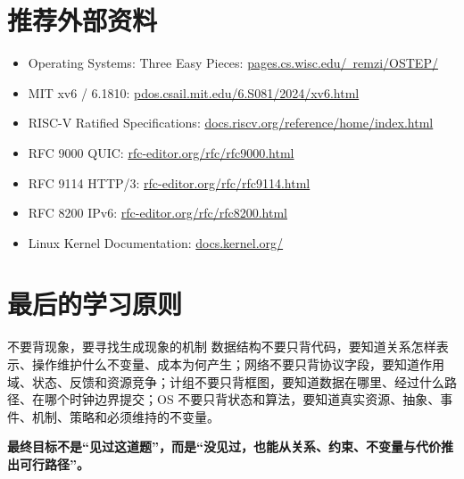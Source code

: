 \documentclass[11pt,a4paper,openany]{ctexbook}
\begin{document}
\section{推荐外部资料}
\begin{itemize}
  \item Operating Systems: Three Easy Pieces: \href{https://pages.cs.wisc.edu/~remzi/OSTEP/}{pages.cs.wisc.edu/~remzi/OSTEP/}
  \item MIT xv6 / 6.1810: \href{https://pdos.csail.mit.edu/6.S081/2024/xv6.html}{pdos.csail.mit.edu/6.S081/2024/xv6.html}
  \item RISC-V Ratified Specifications: \href{https://docs.riscv.org/reference/home/index.html}{docs.riscv.org/reference/home/index.html}
  \item RFC 9000 QUIC: \href{https://www.rfc-editor.org/rfc/rfc9000.html}{rfc-editor.org/rfc/rfc9000.html}
  \item RFC 9114 HTTP/3: \href{https://www.rfc-editor.org/rfc/rfc9114.html}{rfc-editor.org/rfc/rfc9114.html}
  \item RFC 8200 IPv6: \href{https://www.rfc-editor.org/rfc/rfc8200.html}{rfc-editor.org/rfc/rfc8200.html}
  \item Linux Kernel Documentation: \href{https://docs.kernel.org/}{docs.kernel.org/}
\end{itemize}

\section{最后的学习原则}
\begin{corebox}{不要背现象，要寻找生成现象的机制}
数据结构不要只背代码，要知道关系怎样表示、操作维护什么不变量、成本为何产生；网络不要只背协议字段，要知道作用域、状态、反馈和资源竞争；计组不要只背框图，要知道数据在哪里、经过什么路径、在哪个时钟边界提交；OS 不要只背状态和算法，要知道真实资源、抽象、事件、机制、策略和必须维持的不变量。
\end{corebox}

\begin{center}
\Large\bfseries\color{deep}
最终目标不是“见过这道题”，而是“没见过，也能从关系、约束、不变量与代价推出可行路径”。
\end{center}
\end{document}
